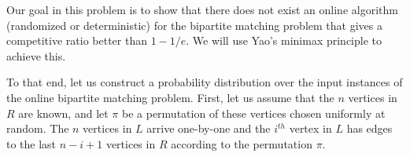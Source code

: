 \documentclass[addpoints,12pt]{exam}
\begin{document}
\begin{questions}
	\question Our goal in this problem is to show that there does not exist an online algorithm (randomized or deterministic) for the bipartite matching problem that gives a competitive ratio better than $1 - 1/e$. We will use Yao's minimax principle to achieve this.
	
	To that end, let us construct a probability distribution over the input instances of the online bipartite matching problem. First, let us assume that the $n$ vertices in $R$ are known, and let $\pi$ be a permutation of these vertices chosen uniformly at random. The $n$ vertices in $L$ arrive one-by-one and the $i^{th}$ vertex in $L$ has edges to the last $n-i+1$ vertices in $R$ according to the permutation $\pi$. 
	
		
	\end{questions}
\end{document}
